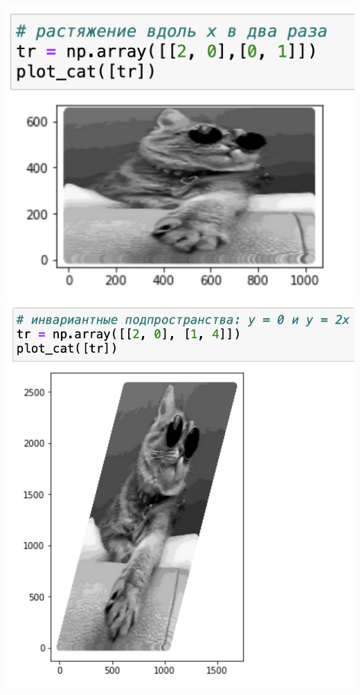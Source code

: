 \documentclass[a4paper, 12pt]{article}
\begin{document}
\begin{spacing}{1.5}
\includegraphics[scale=0.4]{streching.png}
\includegraphics[scale=0.45]{invariance1.png}

\end{spacing}
\end{document}
